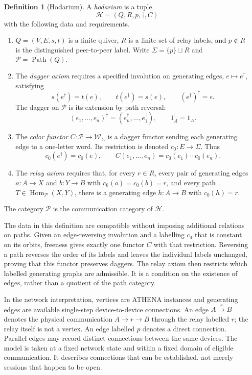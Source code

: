 \documentclass[11pt,a4paper]{article}
\theoremstyle{definition}
\newtheorem{definition}{Definition}[section]
\theoremstyle{plain}
\newcommand{\Path}{\operatorname{Path}}
\newcommand{\Hom}{\operatorname{Hom}}
\newcommand{\PP}{\mathcal P}
\newcommand{\HH}{\mathcal H}
\newcommand{\WW}{\mathcal W}
\begin{document}
\begin{definition}[Hodarium]
\label{def:hodarium}
A \emph{hodarium} is a tuple
\[
 \HH=(Q,R,p,\dagger,C)
\]
with the following data and requirements.
\begin{enumerate}
\item $Q=(V,E,s,t)$ is a finite quiver, $R$ is a finite set of relay
labels, and $p\notin R$ is the distinguished peer-to-peer label.
Write $\Sigma=\{p\}\sqcup R$ and $\PP=\Path(Q)$.

\item The \emph{dagger axiom} requires a specified involution on
generating edges, $e\mapsto e^\dagger$, satisfying
\[
 s(e^\dagger)=t(e),\qquad t(e^\dagger)=s(e),\qquad
 (e^\dagger)^\dagger=e.
\]
The dagger on $\PP$ is its extension by path reversal:
\[
 (e_1,\ldots,e_n)^\dagger=(e_n^\dagger,\ldots,e_1^\dagger),
 \qquad 1_A^\dagger=1_A.
\]

\item The \emph{color functor} $C:\PP\to\WW_\Sigma$ is a dagger
functor sending each generating edge to a one-letter word. Its
restriction is denoted $c_0:E\to\Sigma$. Thus
\[
 c_0(e^\dagger)=c_0(e),\qquad
 C(e_1,\ldots,e_n)=c_0(e_1)\cdots c_0(e_n).
\]

\item The \emph{relay axiom} requires that, for every $r\in R$, every
pair of generating edges $a:A\to X$ and $b:Y\to B$ with
$c_0(a)=c_0(b)=r$, and every path $T\in\Hom_{\PP}(X,Y)$, there is
a generating edge $h:A\to B$ with $c_0(h)=r$.
\end{enumerate}
The category $\PP$ is the communication category of $\HH$.
\end{definition}

The data in this definition are compatible without imposing additional
relations on paths. Given an edge-reversing involution and a labelling
$c_0$ that is constant on its orbits, freeness gives exactly one functor
$C$ with that restriction. Reversing a path reverses the order of its
labels and leaves the individual labels unchanged, proving that this
functor preserves daggers. The relay axiom then restricts which labelled
generating graphs are admissible. It is a condition on the existence of
edges, rather than a quotient of the path category.

In the network interpretation, vertices are ATHENA instances and
generating edges are available single-step device-to-device connections.
An edge $A\xrightarrow{r}B$ denotes the physical communication
$A\to r\to B$ through the relay labelled $r$; the relay itself is not
a vertex. An edge labelled $p$ denotes a direct connection. Parallel
edges may record distinct connections between the same devices. The
model is taken at a fixed network state and within a fixed domain of
eligible communication. It describes connections that can be
established, not merely sessions that happen to be open.
\end{document}
